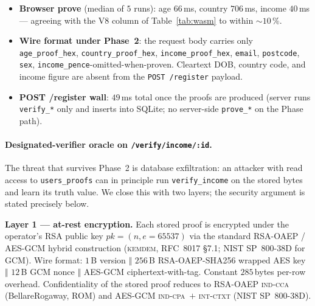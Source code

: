 \documentclass[11pt,a4paper]{article}
\begin{document}
\begin{itemize}
  \item \textbf{Browser prove} (median of $5$ runs): age
        $\num{66}$\,ms, country $\num{706}$\,ms, income
        $\num{40}$\,ms — agreeing with the V8 column of
        Table~\ref{tab:wasm} to within $\sim\!10\,\%$.
  \item \textbf{Wire format under Phase~2}: the request body
        carries only \texttt{age\_proof\_hex},
        \texttt{country\_proof\_hex}, \texttt{income\_proof\_hex},
        \texttt{email}, \texttt{postcode}, \texttt{sex},
        \texttt{income\_pence}-omitted-when-proven.  Cleartext
        DOB, country code, and income figure are absent from the
        \texttt{POST /register} payload.
  \item \textbf{POST /register wall}: $\num{49}$\,ms total once
        the proofs are produced (server runs \texttt{verify\_*}
        only and inserts into SQLite; no server\nobreakdash-side
        \texttt{prove\_*} on the Phase path).
\end{itemize}

\paragraph{Designated\nobreakdash-verifier oracle on
\texttt{/verify/income/:id}.}  The threat that survives Phase~2
is database exfiltration: an attacker with read access to
\texttt{users\_proofs} can in principle run
\texttt{verify\_income} on the stored bytes and learn its truth
value.  We close this with two layers; the security argument is
stated precisely below.

\textbf{Layer 1 — at\nobreakdash-rest encryption.}  Each
stored proof is encrypted under the operator's
RSA public key
$\mathit{pk} = (n, e {=} 65537)$ via the standard
RSA\nobreakdash-OAEP / AES\nobreakdash-GCM
hybrid construction (\textsc{kem}\textendash\textsc{dem}, RFC~8017
§7.1; NIST SP~800\nobreakdash-38D for GCM).  Wire format:
$1$\,B version $\Vert$ $256$\,B RSA\nobreakdash-OAEP\nobreakdash-SHA256
wrapped AES key $\Vert$ $12$\,B GCM nonce
$\Vert$ AES\nobreakdash-GCM
ciphertext\nobreakdash-with\nobreakdash-tag.  Constant
$\num{285}$\,bytes per\nobreakdash-row overhead.  Confidentiality
of the stored proof reduces to RSA\nobreakdash-OAEP
\textsc{ind\nobreakdash-cca} (Bellare\textendash Rogaway,
ROM) and AES\nobreakdash-GCM \textsc{ind\nobreakdash-cpa}~$+$
\textsc{int\nobreakdash-ctxt} (NIST SP~800\nobreakdash-38D).
\end{document}
